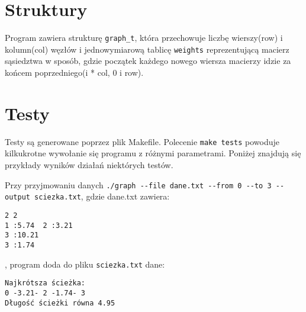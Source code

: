 \documentclass[]{article}
\begin{document}
\begin{figure}[!h]
\end{figure}
\section{Struktury}\label{header-n279}
Program zawiera strukturę \texttt{graph\_t}, która przechowuje liczbę wierszy(row) i kolumn(col) węzłów i jednowymiarową tablicę \texttt{weights} reprezentującą macierz sąsiedztwa w sposób, gdzie początek każdego nowego wiersza macierzy idzie za końcem poprzedniego(i * col, 0 \leqslant i \leqslant row). 

\section{Testy}\label{header-n256}
Testy są generowane poprzez plik Makefile. Polecenie \texttt{make tests} powoduje kilkukrotne wywołanie się programu z różnymi parametrami. Poniżej znajdują się przykłady wyników działań niektórych testów.

\bigskip
Przy przyjmowaniu danych \texttt{./graph -{}-file dane.txt -{}-from 0 -{}-to 3 -{}-output  sciezka.txt}, gdzie dane.txt zawiera:
\begin{verbatim}
2 2
1 :5.74  2 :3.21
3 :10.21  
3 :1.74
\end{verbatim}
, program doda do pliku \texttt{sciezka.txt} dane:
\begin{verbatim}
Najkrótsza ścieżka:
0 -3.21- 2 -1.74- 3
Długość ścieżki równa 4.95
\end{verbatim}
\end{document}
